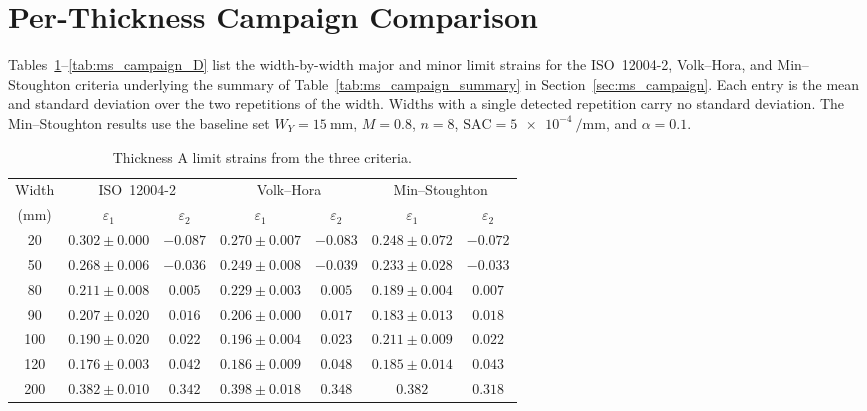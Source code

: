 \section{Per-Thickness Campaign Comparison}
\label{app:ms_campaign_tables}

Tables~\ref{tab:minstoughton_campaign}--\ref{tab:ms_campaign_D} list the
width-by-width major and minor limit strains for the ISO~12004-2, Volk--Hora,
and Min--Stoughton criteria underlying the summary of
Table~\ref{tab:ms_campaign_summary} in Section~\ref{sec:ms_campaign}. Each
entry is the mean and standard deviation over the two repetitions of the
width. Widths with a single detected repetition carry no standard deviation.
The Min--Stoughton results use the baseline set $W_Y=\SI{15}{\milli\meter}$,
$M=0.8$, $n=8$, $\mathrm{SAC}=\SI{5e-4}{\per\milli\meter}$, and $\alpha=0.1$.

\begin{table}[H]
    \centering
    \small
    \begin{tabular}{c c c c c c c}
        \toprule
        Width & \multicolumn{2}{c}{ISO~12004-2} & \multicolumn{2}{c}{Volk--Hora} & \multicolumn{2}{c}{Min--Stoughton} \\
        \cmidrule(lr){2-3}\cmidrule(lr){4-5}\cmidrule(lr){6-7}
        (\si{\milli\meter}) & $\varepsilon_1$ & $\varepsilon_2$ & $\varepsilon_1$ & $\varepsilon_2$ & $\varepsilon_1$ & $\varepsilon_2$ \\
        \midrule
        20  & $0.302 \pm 0.000$ & $-0.087$ & $0.270 \pm 0.007$ & $-0.083$ & $0.248 \pm 0.072$ & $-0.072$ \\
        50  & $0.268 \pm 0.006$ & $-0.036$ & $0.249 \pm 0.008$ & $-0.039$ & $0.233 \pm 0.028$ & $-0.033$ \\
        80  & $0.211 \pm 0.008$ & $0.005$  & $0.229 \pm 0.003$ & $0.005$  & $0.189 \pm 0.004$ & $0.007$ \\
        90  & $0.207 \pm 0.020$ & $0.016$  & $0.206 \pm 0.000$ & $0.017$  & $0.183 \pm 0.013$ & $0.018$ \\
        100 & $0.190 \pm 0.020$ & $0.022$  & $0.196 \pm 0.004$ & $0.023$  & $0.211 \pm 0.009$ & $0.022$ \\
        120 & $0.176 \pm 0.003$ & $0.042$  & $0.186 \pm 0.009$ & $0.048$  & $0.185 \pm 0.014$ & $0.043$ \\
        200 & $0.382 \pm 0.010$ & $0.342$  & $0.398 \pm 0.018$ & $0.348$  & $0.382$           & $0.318$ \\
        \bottomrule
    \end{tabular}
    \caption[Min--Stoughton campaign comparison, thickness~A]{Thickness A limit strains from the three criteria.}
    \label{tab:minstoughton_campaign}
\end{table}

